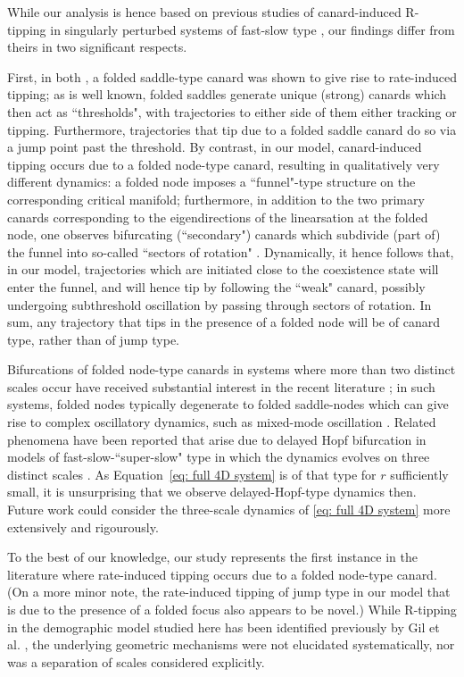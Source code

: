 \documentclass{article}
\theoremstyle{definition}
\numberwithin{equation}{section}
\begin{document}
While our analysis is hence based on previous studies of canard-induced R-tipping in singularly perturbed systems of fast-slow type \cite{Plankton-tipping,vanselow_2019_when}, our findings differ from theirs in two significant respects.

First, in both \cite{Plankton-tipping,vanselow_2019_when}, a folded saddle-type canard was shown to give rise to rate-induced tipping; as is well known, folded saddles generate unique (strong) canards which then act as ``thresholds", with trajectories to either side of them either tracking or tipping. Furthermore, trajectories that tip due to a folded saddle canard do so via a jump point past the threshold. By contrast, in our model, canard-induced tipping occurs due to a folded node-type canard, resulting in qualitatively very different dynamics: a folded node imposes a ``funnel"-type structure on the corresponding critical manifold; furthermore, in addition to the two primary canards corresponding to the eigendirections of the linearsation at the folded node, one observes bifurcating (``secondary") canards which subdivide (part of) the funnel into so-called ``sectors of rotation" \cite{MR2136520}. Dynamically, it hence follows that, in our model, trajectories which are initiated close to the coexistence state will enter the funnel, and will hence tip by following the ``weak" canard, possibly undergoing subthreshold oscillation by passing through sectors of rotation. In sum, any trajectory that tips in the presence of a folded node will be of canard type, rather than of jump type.

Bifurcations of folded node-type canards in systems where more than two distinct scales occur have received substantial interest in the recent literature \cite{6c8c3bfcb06e4fb8b0cd94ae49d0c15b}; in such systems, folded nodes typically degenerate to folded saddle-nodes which can give rise to complex oscillatory dynamics, such as mixed-mode oscillation \cite{MR2916308}. Related phenomena have been reported that arise due to delayed Hopf bifurcation in models of fast-slow-``super-slow" type in which the dynamics evolves on three distinct scales \cite{de2016sector}. As Equation~\eqref{eq: full 4D system} is of that type for $r$ sufficiently small, it is unsurprising that we observe delayed-Hopf-type dynamics then. Future work could consider the three-scale dynamics of \eqref{eq: full 4D system} more extensively and rigourously.

To the best of our knowledge, our study represents the first instance in the literature where rate-induced tipping occurs due to a folded node-type canard. (On a more minor note, the rate-induced tipping of jump type in our model that is due to the presence of a folded focus also appears to be novel.) While R-tipping in the demographic model studied here has been identified previously by Gil et al. \cite{gil2020}, the underlying geometric mechanisms were not elucidated systematically, nor was a separation of scales considered explicitly.
\end{document}

